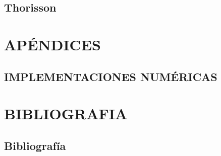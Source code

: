 \documentclass{report}
\begin{document}
\chapter{Thorisson}



\part{APÉNDICES}

\chapter{IMPLEMENTACIONES NUMÉRICAS}

\part{BIBLIOGRAFIA}

\chapter{Bibliografía}

\end{document}
